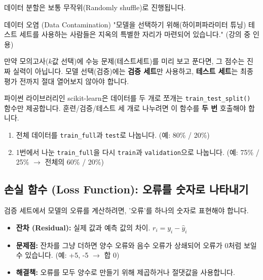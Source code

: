 \documentclass[11pt,a4paper]{book}
\theoremstyle{definition}
\begin{document}
데이터 분할은 보통 무작위(Randomly shuffle)로 진행됩니다.

\begin{cautionbox}{데이터 오염 (Data Contamination)}
"모델을 선택하기 위해(하이퍼파라미터 튜닝) 테스트 세트를 사용하는 사람들은 지옥의 특별한 자리가 마련되어 있습니다." (강의 중 인용)

만약 모의고사($k$값 선택)에 수능 문제($테스트 세트$)를 미리 보고 푼다면, 그 점수는 진짜 실력이 아닙니다.
모델 선택(검증)에는 \textbf{검증 세트}만 사용하고, \textbf{테스트 세트}는 최종 평가 전까지 절대 열어보지 않아야 합니다.
\end{cautionbox}

\begin{examplebox}[title={scikit-learn의 \texttt{train\_test\_split}}]
파이썬 라이브러리인 scikit-learn은 데이터를 두 개로 쪼개는 \texttt{train\_test\_split()} 함수만 제공합니다.
훈련/검증/테스트 세 개로 나누려면 이 함수를 \textbf{두 번} 호출해야 합니다.

\begin{enumerate}
    \item 전체 데이터를 \texttt{train\_full}과 \texttt{test}로 나눕니다. (예: 80\% / 20\%)
    \item 1번에서 나눈 \texttt{train\_full}을 다시 \texttt{train}과 \texttt{validation}으로 나눕니다. (예: 75\% / 25\% $\rightarrow$ 전체의 60\% / 20\%)
\end{enumerate}
\end{examplebox}

\subsection{손실 함수 (Loss Function): 오류를 숫자로 나타내기}

검증 세트에서 모델의 오류를 계산하려면, '오류'를 하나의 숫자로 표현해야 합니다.

\begin{itemize}
    \item \textbf{잔차 (Residual):} 실제 값과 예측 값의 차이. $r_i = y_i - \hat{y}_i$
    \item \textbf{문제점:} 잔차를 그냥 더하면 양수 오류와 음수 오류가 상쇄되어 오류가 0처럼 보일 수 있습니다. (예: +5, -5 $\rightarrow$ 합 0)
    \item \textbf{해결책:} 오류를 모두 양수로 만들기 위해 제곱하거나 절댓값을 사용합니다.
\end{itemize}
\end{document}
